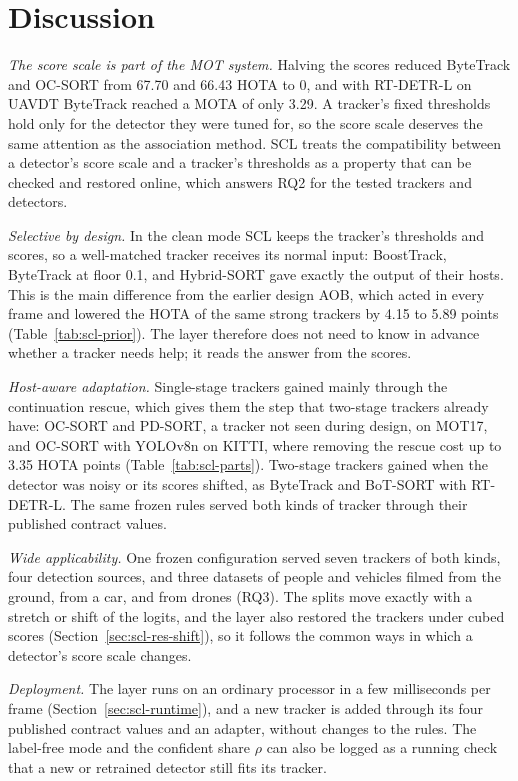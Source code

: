 \section{Discussion}\label{sec:scl-discussion}
\emph{The score scale is part of the MOT system.} Halving the scores reduced ByteTrack and OC-SORT from 67.70 and 66.43 HOTA to 0, and with RT-DETR-L on UAVDT ByteTrack reached a MOTA of only 3.29. A tracker's fixed thresholds hold only for the detector they were tuned for, so the score scale deserves the same attention as the association method. SCL treats the compatibility between a detector's score scale and a tracker's thresholds as a property that can be checked and restored online, which answers RQ2 for the tested trackers and detectors.

\emph{Selective by design.} In the clean mode SCL keeps the tracker's thresholds and scores, so a well-matched tracker receives its normal input: BoostTrack, ByteTrack at floor 0.1, and Hybrid-SORT gave exactly the output of their hosts. This is the main difference from the earlier design AOB, which acted in every frame and lowered the HOTA of the same strong trackers by 4.15 to 5.89 points (Table~\ref{tab:scl-prior}). The layer therefore does not need to know in advance whether a tracker needs help; it reads the answer from the scores.

\emph{Host-aware adaptation.} Single-stage trackers gained mainly through the continuation rescue, which gives them the step that two-stage trackers already have: OC-SORT and PD-SORT, a tracker not seen during design, on MOT17, and OC-SORT with YOLOv8n on KITTI, where removing the rescue cost up to 3.35 HOTA points (Table~\ref{tab:scl-parts}). Two-stage trackers gained when the detector was noisy or its scores shifted, as ByteTrack and BoT-SORT with RT-DETR-L. The same frozen rules served both kinds of tracker through their published contract values.

\emph{Wide applicability.} One frozen configuration served seven trackers of both kinds, four detection sources, and three datasets of people and vehicles filmed from the ground, from a car, and from drones (RQ3). The splits move exactly with a stretch or shift of the logits, and the layer also restored the trackers under cubed scores (Section~\ref{sec:scl-res-shift}), so it follows the common ways in which a detector's score scale changes.

\emph{Deployment.} The layer runs on an ordinary processor in a few milliseconds per frame (Section~\ref{sec:scl-runtime}), and a new tracker is added through its four published contract values and an adapter, without changes to the rules. The label-free mode and the confident share $\rho$ can also be logged as a running check that a new or retrained detector still fits its tracker.

